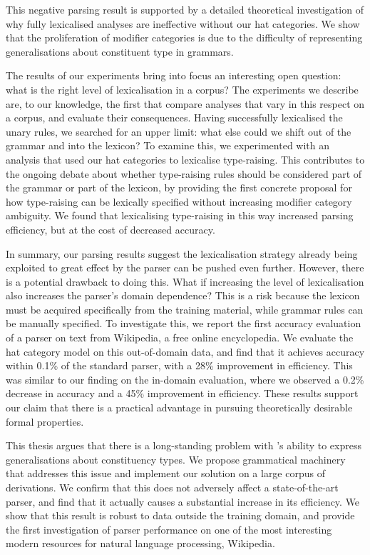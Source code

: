 This negative parsing result is supported by a detailed theoretical investigation of
why fully lexicalised \ccg analyses are ineffective without our hat categories.
We show that the proliferation of modifier categories is due to the difficulty
of representing generalisations about constituent type in \ccg grammars.

The results of our experiments bring into focus an interesting open question:
what is the right level of lexicalisation in a corpus? The experiments we describe
are, to our
knowledge, the first that compare analyses that vary in this respect
on a corpus, and evaluate their consequences. Having successfully lexicalised
the \ccgbank unary rules, we searched for an upper limit: what else could we shift
out of the grammar and into the lexicon? To examine this, we experimented with
an analysis that used our hat categories to lexicalise type-raising. This
contributes to the ongoing debate about whether type-raising rules should be
considered part of the grammar or part of the lexicon, by providing the first
concrete proposal for how type-raising can be lexically specified without
increasing modifier category ambiguity.  We found that lexicalising
type-raising in this way increased parsing efficiency, but at the cost of
decreased accuracy.


In summary, our parsing results suggest the lexicalisation strategy already
being exploited to great effect by the \candc parser can be pushed even further.
However, there is a potential drawback to doing this. What if increasing the
level of lexicalisation also increases the parser's domain dependence? This is a
risk because the lexicon must be acquired specifically from the training
material, while grammar rules can be manually specified. To investigate this, we
report the first accuracy evaluation of a parser on text from Wikipedia, a free online
encyclopedia.
We evaluate the hat category model on this out-of-domain data, and find
that it achieves accuracy within 0.1\% of the standard \candc parser, with a
28\% improvement in efficiency. This was similar to our finding on the in-domain
evaluation, where we observed a 0.2\% decrease in accuracy and a 45\%
improvement in efficiency. These results support our claim that there is a
practical advantage in pursuing theoretically desirable formal properties. 

This thesis argues that there is a long-standing problem with \ccg's ability to
express generalisations about constituency types. We propose grammatical machinery that
addresses this issue and implement our solution on a large corpus of \ccg
derivations. We confirm that this does not adversely affect a state-of-the-art
\ccg parser, and find that it actually causes a substantial increase in its
efficiency. We show that this result is robust to data outside the training
domain, and provide the first investigation of parser performance on one of the
most interesting modern resources for natural language processing, Wikipedia.

